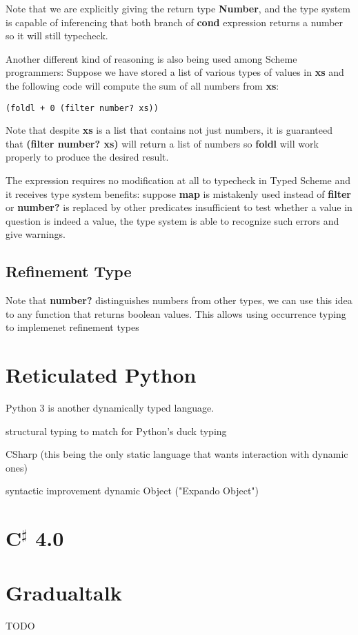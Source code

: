 Note that we are explicitly giving the return type \textbf{Number},
and the type system is capable of inferencing that
both branch of \textbf{cond} expression returns a number
so it will still typecheck.

Another different kind of reasoning is also being used among Scheme programmers:
Suppose we have stored a list of various types of values in \textbf{xs}
and the following code will compute the sum of all numbers from \textbf{xs}:

\begin{verbatim}
(foldl + 0 (filter number? xs))
\end{verbatim}

Note that despite \textbf{xs} is a list that contains not just numbers,
it is guaranteed that \textbf{(filter number? xs)} will return a list of numbers
so \textbf{foldl} will work properly to produce the desired result.

The expression requires no modification at all to typecheck in Typed Scheme
and it receives type system benefits: suppose \textbf{map} is mistakenly
used instead of \textbf{filter} or \textbf{number?} is replaced by
other predicates insufficient to test whether a value in question is indeed a value,
the type system is able to recognize such errors and give warnings.

\subsection{Refinement Type}

Note that \textbf{number?} distinguishes numbers from other types,
we can use this idea to any function that returns boolean values.
This allows using occurrence typing to implemenet refinement types

\section{Reticulated Python}

Python 3 is another dynamically typed language.

structural typing to match for Python's duck typing

CSharp (this being the only static language that wants interaction with dynamic ones)

syntactic improvement
dynamic Object ("Expando Object")

\section{C$^\sharp$ 4.0}


\section{Gradualtalk}

TODO
